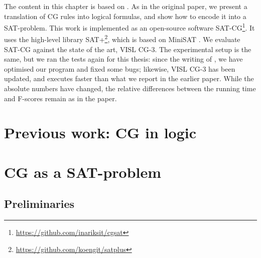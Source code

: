 The content in this chapter is based on \cite{listenmaa_claessen2015}.
As in the original paper, we present a translation of CG rules into logical formulas, and show how to encode it into a SAT-problem.
This work is implemented as an open-source software SAT-CG\footnote{\url{https://github.com/inariksit/cgsat}}. It uses the high-level library SAT+\footnote{\url{https://github.com/koengit/satplus}}, which is based on MiniSAT \cite{een04sat}.
We evaluate SAT-CG against the state of the art, VISL CG-3.
The experimental setup is the same, but we ran the tests again for this thesis: since the writing of  \cite{listenmaa_claessen2015}, we have optimised our program and fixed some bugs; likewise, VISL CG-3 has been updated, and executes faster than what we report in the earlier paper. 
While the absolute numbers have changed, the relative differences between the running time and F-scores remain as in the paper.


\section{Previous work: CG in logic}\label{encoding-in-logic}




\section{CG as a SAT-problem}
\label{sec:CGSAT}


\subsection{Preliminaries}

